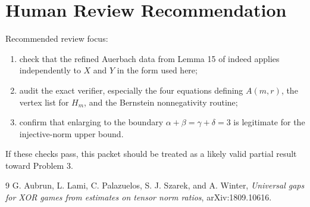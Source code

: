\documentclass[11pt]{article}
\begin{document}
\section*{Human Review Recommendation}

Recommended review focus:
\begin{enumerate}
\item check that the refined Auerbach data from Lemma 15 of \cite{ALPSW}
indeed applies independently to \(X\) and \(Y\) in the form used here;
\item audit the exact verifier, especially the four equations defining
\(A(m,r)\), the vertex list for \(H_m\), and the Bernstein nonnegativity
routine;
\item confirm that enlarging to the boundary \(\alpha+\beta=\gamma+\delta=3\)
is legitimate for the injective-norm upper bound.
\end{enumerate}
If these checks pass, this packet should be treated as a likely valid partial
result toward Problem 3.

\begin{thebibliography}{9}
G. Aubrun, L. Lami, C. Palazuelos, S. J. Szarek, and A. Winter,
\emph{Universal gaps for XOR games from estimates on tensor norm ratios},
arXiv:1809.10616.
\end{thebibliography}
\end{document}
